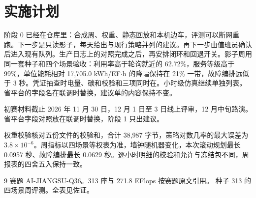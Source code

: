 \clearpage
\section{实施计划}
阶段 0 已经在仓库里：合成周、权重、静态回放和本机边车，评测可以断网重跑。下一步是只读影子，每天给出与现行策略并列的建议。再下一步由值班员确认后进入现有队列。生产日志上的对照完成之后，再安排闭环和回退开关。影子周用同一套种子和四个场景验收：利用率高于轮询就近的 62.72\%，服务等级高于 99\%，单位能耗相对 17{,}705.0 kWh/EF$\cdot$h 的降幅保持在 21\% 一带，故障编排远低于 3 秒。凭证抽查时电量、碳和校验和三项同时在。小时级仿真继续单独列表。省平台的字段名在联调时替换，建议单的内容保持不变。

初赛材料截止 2026 年 11 月 30 日，12 月 1 日至 3 日线上评审，12 月中旬路演。省平台字段对照放在联调时替换，阶段 1 只出建议。

权重校验核对五份文件的校验和，合计 38{,}987 字节，策略对数几率的最大误差为 $3.8\times 10^{-6}$。周指标以四场景等权表为准，墙钟随机器变化，本次滚动规划最长 0.0957 秒、故障编排最长 0.0629 秒。逐小时明细的校验和允许与冻结包不同，周报表的四舍五入保持一致。

\begin{thebibliography}{9}
 赛题 AI-JIANGSU-Q36。313 座与 271.8 EFlops 按赛题原文引用。
 种子 313 的四场景周评测。全表见佐证。
\end{thebibliography}

